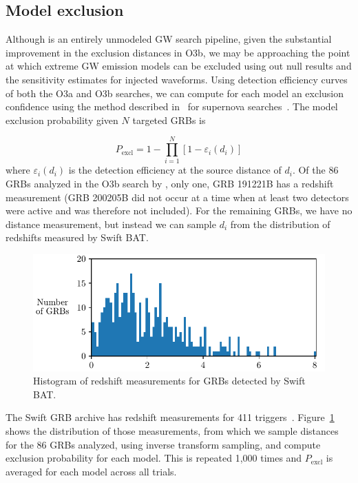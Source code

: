 \subsection{Model exclusion}\label{sec:grb-o3b-models}

Although \xpip is an entirely unmodeled \ac{GW} search pipeline, given the substantial improvement in the exclusion distances in O3b, we may be approaching the point at which extreme GW emission models can be excluded using out null results and the sensitivity estimates for injected waveforms.
Using detection efficiency curves of both the O3a and O3b searches, we can compute for each model an exclusion confidence using the method described in~\citet{Kalmus_2013} for supernova searches~\citep{burst_o2}.
The model exclusion probability given $N$ targeted GRBs is

\begin{equation}
	P_{\text{excl}} = 1 - \prod_{i=1}^N \left[ 1 - \varepsilon_i(d_i) \right]
\end{equation}
where $\varepsilon_i(d_i)$ is the detection efficiency at the source distance of $d_i$.
Of the 86 GRBs analyzed in the O3b search by \xpip, only one, GRB 191221B has a redshift measurement (GRB 200205B did not occur at a time when at least two detectors were active and was therefore not included).
For the remaining GRBs, we have no distance measurement, but instead we can sample $d_i$ from the distribution of redshifts measured by Swift \ac{BAT}.

\begin{figure}[h]
  \centering
  \includegraphics{figures/grb/redshifts.pdf}
  \caption{Histogram of redshift measurements for GRBs detected by Swift BAT.}
  \label{fig:grb-o3b-redshifts}
\end{figure}

The Swift GRB archive has redshift measurements for 411 triggers~\citep{swift_archive}.
Figure~\ref{fig:grb-o3b-redshifts} shows the distribution of those measurements, from which we sample distances for the 86 GRBs analyzed, using inverse transform sampling, and compute exclusion probability for each model.
This is repeated 1,000 times and $P_{\text{excl}}$ is averaged for each model across all trials.

